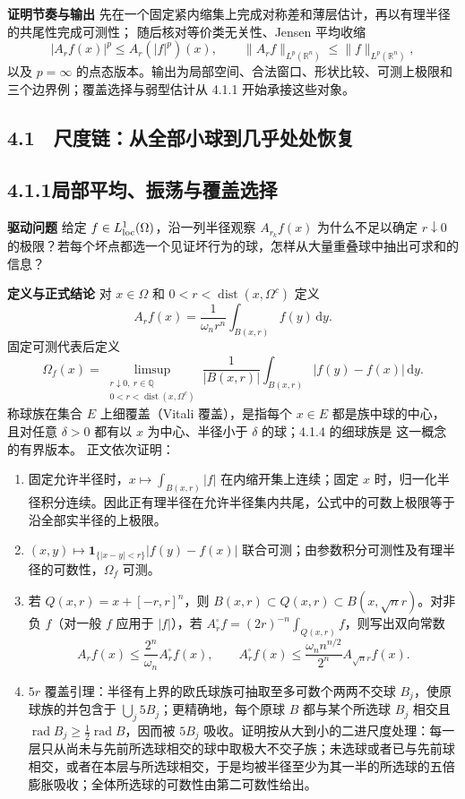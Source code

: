 \documentclass[11pt,a4paper]{ctexart}
\newcommand{\R}{\mathbb R}
\newcommand{\dd}{\,\mathrm d}
\newcommand{\dist}{\operatorname{dist}}
\newcommand{\planitem}[1]{\par\smallskip\noindent\textcolor{deepblue}{\textbf{#1}}\quad}
\newcommand{\unithead}[2]{\subsection{#1\quad #2}}
\begin{document}
\planitem{证明节奏与输出}
先在一个固定紧内缩集上完成对称差和薄层估计，再以有理半径的共尾性完成可测性；
随后核对等价类无关性、Jensen 平均收缩
\[
 |A_rf(x)|^p\le A_r(|f|^p)(x),\qquad
 \|A_rf\|_{L^p(\R^n)}\le\|f\|_{L^p(\R^n)},
\]
以及 $p=\infty$ 的点态版本。输出为局部空间、合法窗口、形状比较、可测上极限和
三个边界例；覆盖选择与弱型估计从 4.1.1 开始承接这些对象。

\subsection*{4.1　尺度链：从全部小球到几乎处处恢复}

\unithead{4.1.1}{局部平均、振荡与覆盖选择}

\planitem{驱动问题}
给定 $f\in L^1_{\rm loc}(\Omega)$，沿一列半径观察 $A_{r_k}f(x)$ 为什么不足以确定 $r\downarrow0$ 的极限？若每个坏点都选一个见证坏行为的球，怎样从大量重叠球中抽出可求和的信息？

\planitem{定义与正式结论}
对 $x\in\Omega$ 和 $0<r<\dist(x,\Omega^c)$ 定义
\[
A_rf(x)=\frac1{\omega_n r^n}\int_{B(x,r)}f(y)\dd y.
\]
固定可测代表后定义
\[
 \Omega_f(x)=\limsup_{\substack{r\downarrow0,\ r\in\mathbb Q\\
0<r<\dist(x,\Omega^c)}}
 \frac1{|B(x,r)|}\int_{B(x,r)}|f(y)-f(x)|\dd y.
\]
称球族在集合 $E$ 上细覆盖（Vitali 覆盖），是指每个 $x\in E$ 都是族中球的中心，
且对任意 $\delta>0$ 都有以 $x$ 为中心、半径小于 $\delta$ 的球；4.1.4 的细球族是
这一概念的有界版本。
正文依次证明：
\begin{enumerate}
\item 固定允许半径时，$x\mapsto\int_{B(x,r)}|f|$ 在内缩开集上连续；固定 $x$ 时，归一化半径积分连续。因此正有理半径在允许半径集内共尾，公式中的可数上极限等于沿全部实半径的上极限。
\item $(x,y)\mapsto\mathbf1_{\{|x-y|<r\}}|f(y)-f(x)|$ 联合可测；由参数积分可测性及有理半径的可数性，$\Omega_f$ 可测。
\item 若 $Q(x,r)=x+[-r,r]^n$，则
$B(x,r)\subset Q(x,r)\subset B(x,\sqrt n r)$。对非负 $f$（对一般 $f$ 应用于 $|f|$），若
$A_r^\square f=(2r)^{-n}\int_{Q(x,r)}f$，则写出双向常数
\[
A_rf(x)\le\frac{2^n}{\omega_n}A_r^\square f(x),\qquad
A_r^\square f(x)\le\frac{\omega_n n^{n/2}}{2^n}A_{\sqrt n r}f(x).
\]
\item $5r$ 覆盖引理：半径有上界的欧氏球族可抽取至多可数个两两不交球 $B_j$，使原球族的并包含于 $\bigcup_j5B_j$；更精确地，每个原球 $B$ 都与某个所选球 $B_j$ 相交且
\(\operatorname{rad}B_j\ge\tfrac12\operatorname{rad}B\)，因而被 $5B_j$ 吸收。证明按从大到小的二进尺度处理：每一层只从尚未与先前所选球相交的球中取极大不交子族；未选球或者已与先前球相交，或者在本层与所选球相交，于是均被半径至少为其一半的所选球的五倍膨胀吸收；全体所选球的可数性由第二可数性给出。
\end{enumerate}
\end{document}
